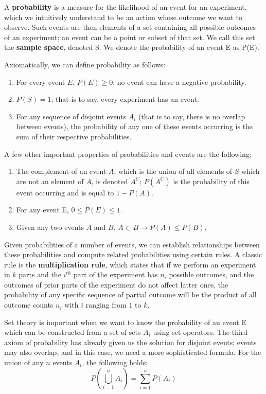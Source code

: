 A \textbf{probability} is a measure for the likelihood of an event for an
experiment, which we intuitively understand to be an action whose
outcome we want to observe. Such events are then elements of a set
containing all possible outcomes of an experiment; an event can be a
point or subset of that set. We call this set the \textbf{sample space},
denoted S. We denote the probability of an event E as P(E).

Axiomatically, we can define probability as follows:

\begin{enumerate}
\item For every event $E$, $P(E) \geq 0$; no event can have a negative probability.
\item $P(S) = 1$; that is to say, every experiment has an event.
\item For any sequence of disjoint events $A_i$ (that is to say,
  there is no overlap between events), the probability of any one of
  these events occurring is the sum of their respective probabilities.
\end{enumerate}

A few other important properties of probabilities and events are the following:

\begin{enumerate}
\item The complement of an event $A$, which is the union of all
  elements of $S$ which are not an element of $A$, is denoted $A^C$;
  $P(A^C)$ is the probability of this event occurring and is equal to $1
  - P(A)$.
\item For any event E, $0 \leq P(E) \leq 1$.
\item Given any two events $A$ and $B$, $A \subset B \rightarrow P(A) \leq P(B)$.
\end{enumerate}

Given probabilities of a number of events, we can establish
relationships between these probabilities and compute related
probabilities using certain rules. A classic rule is the
\textbf{multiplication rule}, which states that if we perform an
experiment in $k$ parts and the $i^{th}$ part of the experiment has
$n_i$ possible outcomes, and the outcomes of prior parts of the
experiment do not affect latter ones, the probability of any specific
sequence of partial outcome will be the product of all outcome counts
$n_i$ with $i$ ranging from $1$ to $k$.

Set theory is important when we want to know the probability of an
event E which can be constructed from a set of sets $A_i$ using set
operators. The third axiom of probability has already given us the
solution for disjoint events; events may also overlap, and in this
case, we need a more sophisticated formula. For the union of any $n$
events $A_i$, the following holds:
\begin{equation}
  P(\bigcup_{i=1}^n A_i) = \sum\limits_{i=1}^n P(A_i)
\end{equation}

